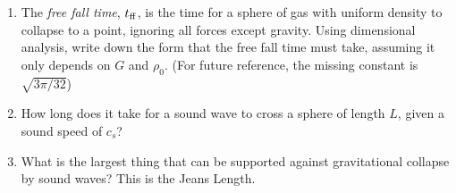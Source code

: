 
     \begin{enumerate}
         \item {} The \emph{free fall time}, $t_{\rm{ff}}$, is the time for a sphere of gas with uniform
       density to collapse to a point, ignoring all forces except gravity.  Using dimensional analysis, write down the
       form that the free fall time must take, assuming it only depends on $G$ and
       $\rho_0$.  (For future reference, the missing constant is $\sqrt{3
       \pi/32}$)
   \item {} How long does it take for a sound wave to cross a sphere of
       length $L$, given a sound speed of $c_s$?
   \item {} What is the largest thing that can be supported against
       gravitational collapse by sound waves?  This is the Jeans Length.
       \end{enumerate}


